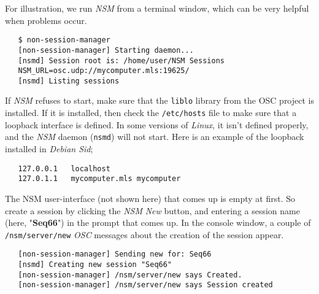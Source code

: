 

   For illustration, we run \textsl{NSM} from a terminal window, which can be
   very helpful when problems occur.

\begin{verbatim}
   $ non-session-manager
   [non-session-manager] Starting daemon...
   [nsmd] Session root is: /home/user/NSM Sessions
   NSM_URL=osc.udp://mycomputer.mls:19625/
   [nsmd] Listing sessions
\end{verbatim}

   If \textsl{NSM} refuses to start, make sure that the \texttt{liblo} library
   from the OSC project is installed.  If it is installed, then check the
   \texttt{/etc/hosts} file to make sure that a loopback interface is
   defined. In some versions of \textsl{Linux}, it isn't defined properly,
   and the \textsl{NSM} daemon (\texttt{nsmd}) will not start.
   Here is an example of the loopback installed in \textsl{Debian Sid};

\begin{verbatim}
   127.0.0.1   localhost
   127.0.1.1   mycomputer.mls mycomputer
\end{verbatim}

   The NSM user-interface (not shown here) that comes up is empty at first.
   So create a session by clicking the \textsl{NSM}
   \textsl{New} button, and entering a session name
   (here, "\textbf{Seq66}") in the
   prompt that comes up.  In the console window, a couple of 
   \texttt{/nsm/server/new} \textsl{OSC} messages
   about the creation of the session appear.

\begin{verbatim}
   [non-session-manager] Sending new for: Seq66
   [nsmd] Creating new session "Seq66"
   [non-session-manager] /nsm/server/new says Created.
   [non-session-manager] /nsm/server/new says Session created
\end{verbatim}

